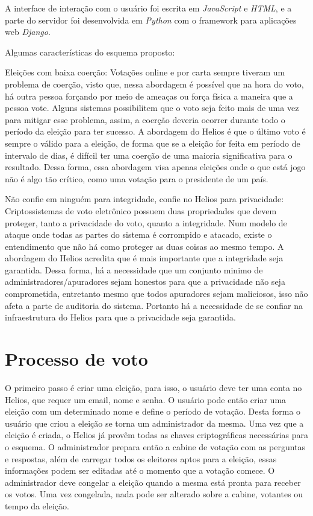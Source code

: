\documentclass{ufsctex/ufsctex}
\begin{document}
A interface de interação com o usuário foi escrita em \textit{JavaScript} e
\textit{HTML}, e a parte do servidor foi desenvolvida em \textit{Python} com o
framework para aplicações web \textit{Django}. 

Algumas características do esquema proposto:

Eleições com baixa coerção: Votações online e por carta sempre tiveram um
problema de coerção, visto que, nessa abordagem é possível que na hora do voto,
há outra pessoa forçando por meio de ameaças ou força física a maneira que a
pessoa vote. Alguns sistemas possibilitem que o voto seja feito mais de uma vez
para mitigar esse problema, assim, a coerção deveria ocorrer durante todo o
período da eleição para ter sucesso. A abordagem do Helios é que o último voto
é sempre o válido para a eleição, de forma que se a eleição for feita em
período de intervalo de dias, é difícil ter uma coerção de uma maioria
significativa para o resultado. Dessa forma, essa abordagem visa apenas
eleições onde o que está jogo não é algo tão crítico, como uma votação para o
presidente de um país.

Não confie em ninguém para integridade, confie no Helios para privacidade:
Criptossistemas de voto eletrônico possuem duas propriedades que devem
proteger, tanto a privacidade do voto, quanto a integridade. Num modelo de
ataque onde todas as partes do sistema é corrompido e atacado, existe o
entendimento que não há como proteger as duas coisas ao mesmo tempo. A
abordagem do Helios acredita que é mais importante que a integridade seja
garantida. Dessa forma, há a necessidade que um conjunto minimo de
administradores/apuradores sejam honestos para que a privacidade não seja
comprometida, entretanto mesmo que todos apuradores sejam maliciosos, isso não
afeta a parte de auditoria do sistema. Portanto há a necessidade de se confiar
na infraestrutura do Helios para que a privacidade seja garantida.


\section{Processo de voto}

O primeiro passo é criar uma eleição, para isso, o usuário deve ter uma conta
no Helios, que requer um email, nome e senha. O usuário pode então criar uma
eleição com um determinado nome e define o período de votação. Desta forma o
usuário que criou a eleição se torna um administrador da mesma. Uma vez que a
eleição é criada, o Helios já provêm todas as chaves criptográficas necessárias
para o esquema. O administrador prepara então a cabine de votação com as
perguntas e respostas, além de carregar todos os eleitores aptos para a
eleição, essas informações podem ser editadas até o momento que a votação
comece. O administrador deve congelar a eleição quando a mesma está pronta para
receber os votos. Uma vez congelada, nada pode ser alterado sobre a cabine,
votantes ou tempo da eleição.
\end{document}
